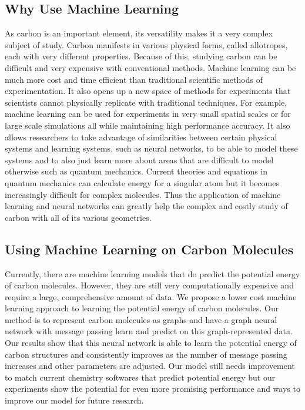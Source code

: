 \documentclass[12pt, abstract = true]{scrartcl}
\begin{document}
\subsection{Why Use Machine Learning}
As carbon is an important element, its versatility makes it a very
complex subject of study. Carbon manifests in various physical forms,
called allotropes, each with very different properties. Because of
this, studying carbon can be difficult and very expensive with conventional
methods. Machine learning can be much more cost and time efficient than traditional
scientific methods of experimentation. It also opens up a new space of methods for 
experiments that scientists cannot physically replicate with traditional techniques. 
For example, machine learning can be used for experiments in very small spatial
scales or for large scale simulations all while maintaining high
performance accuracy. It also allows researchers to take advantage of similarities 
between certain physical systems and learning systems, such as neural networks, to be 
able to model these systems and to also just learn more about areas that are difficult 
to model otherwise such as quantum mechanics. Current theories and equations in quantum 
mechanics can calculate energy for a singular atom but it becomes increasingly difficult 
for complex molecules. Thus the application of machine learning and neural networks 
can greatly help the complex and costly study of carbon with all of its various geometries.

\subsection{Using Machine Learning on Carbon Molecules}
Currently, there are machine learning models that do predict the potential energy of carbon molecules. However, they are still very computationally expensive and require a large, comprehensive amount of data. We propose a lower cost machine learning approach to learning the potential energy of carbon molecules. Our method is to represent carbon molecules as graphs and have a graph neural network with message passing learn and predict on this graph-represented data. Our results show that this neural network is able to learn the potential energy of carbon structures and consistently improves as the number of message passing increases and other parameters are adjusted. Our model still needs improvement to match current chemistry softwares that predict potential energy but our experiments show the potential for even more promising performance and ways to improve our model for future research.
\newpage
\end{document}
